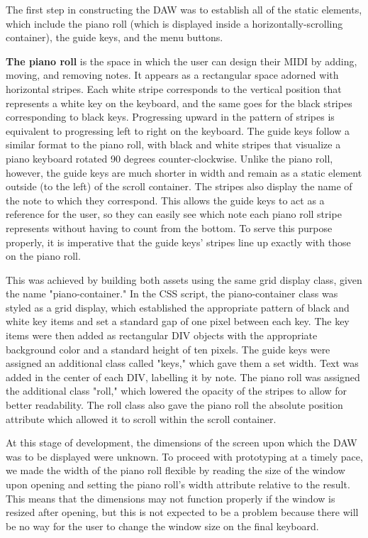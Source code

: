 The first step in constructing the DAW was to establish all of the static elements, which include
the piano roll (which is displayed inside a horizontally-scrolling container), the guide keys, and
the menu buttons.

\textbf{The piano roll} is the space in which the user can design their MIDI by adding,
moving, and removing notes. It appears as a rectangular space adorned with horizontal stripes. Each
white stripe corresponds to the vertical position that represents a white key on the keyboard, and
the same goes for the black stripes corresponding to black keys. Progressing upward in the pattern
of stripes is equivalent to progressing left to right on the keyboard. The guide keys follow a
similar format to the piano roll, with black and white stripes that visualize a piano keyboard
rotated 90 degrees counter-clockwise. Unlike the piano roll, however, the guide keys are much
shorter in width and remain as a static element outside (to the left) of the scroll container.
The stripes also display the name of the note to which they correspond. This allows the guide keys
to act as a reference for the user, so they can easily see which note each piano roll stripe
represents without having to count from the bottom. To serve this purpose properly, it is
imperative that the guide keys' stripes line up exactly with those on the piano roll.

This was achieved by building both assets using the same grid display class, given the name
"piano-container." In the CSS script, the piano-container class was styled as a grid display,
which established the appropriate pattern of black and white key items and set a standard gap of
one pixel between each key. The key items were then added as rectangular DIV objects with the
appropriate background color and a standard height of ten pixels. The guide keys were assigned an
additional class called "keys," which gave them a set width. Text was added in the center of each
DIV, labelling it by note. The piano roll was assigned the additional class "roll," which lowered
the opacity of the stripes to allow for better readability. The roll class also gave the piano roll
the absolute position attribute which allowed it to scroll within the scroll container.

At this stage of development, the dimensions of the screen upon which the DAW was to be displayed
were unknown. To proceed with prototyping at a timely pace, we made the width of the piano roll
flexible by reading the size of the window upon opening and setting the piano roll's width
attribute relative to the result. This means that the dimensions may not function properly if the
window is resized after opening, but this is not expected to be a problem because there will be
no way for the user to change the window size on the final keyboard.

